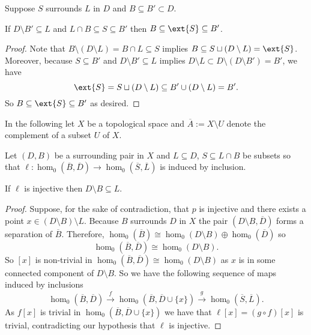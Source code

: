 \begin{lemma}\label{lem:surround_and_cover}
  Suppose $S$ surrounds $L$ in $D$ and $B\subseteq B'\subset D$.

  If $D\setminus B'\subseteq L$ and $L\cap B\subseteq S\subseteq B'$ then $B\subseteq \ext{S}\subseteq B'$.
\end{lemma}
\begin{proof}
  Note that $B\setminus (D\setminus L) = B\cap L\subseteq S$ implies $B\subseteq S\sqcup(D\setminus L) = \ext{S}$.
  Moreover, because $S\subseteq B'$ and $D\setminus B'\subseteq L$ implies $D\setminus L \subset D\setminus (D\setminus B') = B'$, we have
  \[ \ext{S} = S\sqcup (D\setminus L) \subseteq B'\cup (D\setminus L) = B'. \]
  So $B \subseteq \ext{S}\subseteq B'$ as desired.
\end{proof}

In the following let $X$ be a topological space and $\overline{A} := X\setminus U$ denote the complement of a subset $U$ of $X$.

\begin{lemma}\label{lem:coverage}
  Let $(D, B)$ be a surrounding pair in $X$ and $L\subseteq D$, $S\subseteq L\cap B$ be subsets so that $\ell: \hom_0(\overline{B}, \overline{D})\to \hom_0(\overline{S}, \overline{L})$ is induced by inclusion.

  If $\ell$ is injective then $D\setminus B\subseteq L$.
\end{lemma}
\begin{proof}
    Suppose, for the sake of contradiction, that $p$ is injective and there exists a point $x\in (D\setminus B)\setminus L$.
    Because $B$ surrounds $D$ in $X$ the pair $(D\setminus B, \overline{D})$ forms a separation of $\overline{B}$.
    Therefore, $\hom_0(\overline{B})\cong \hom_0(D\setminus B)\oplus \hom_0(\overline{D})$ so
    \[ \hom_0(\overline{B}, \overline{D})\cong \hom_0(D\setminus B). \]
    So $[x]$ is non-trivial in $\hom_0(\overline{B},\overline{D})\cong \hom_0(D\setminus B)$ as $x$ is in some connected component of $D\setminus B$.
    So we have the following sequence of maps induced by inclusions
    \[ \hom_0(\overline{B},\overline{D})\xrightarrow{f} \hom_0(\overline{B},\overline{D}\cup\{x\})\xrightarrow{g} \hom_0(\overline{S},\overline{L}).\]
    As $f[x]$ is trivial in $\hom_0(\overline{B},\overline{D}\cup\{x\})$ we have that $\ell[x] = (g\circ f)[x]$ is trivial, contradicting our hypothesis that $\ell$ is injective.
\end{proof}

